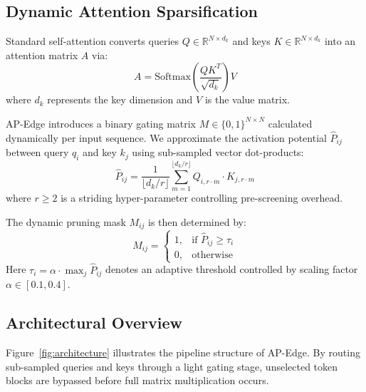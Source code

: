 \documentclass[runningheads]{llncs}
\begin{document}
\subsection{Dynamic Attention Sparsification}
Standard self-attention converts queries $Q \in \mathbb{R}^{N \times d_k}$ and keys $K \in \mathbb{R}^{N \times d_k}$ into an attention matrix $A$ via:
\begin{equation}
    A = \text{Softmax}\left( \frac{Q K^T}{\sqrt{d_k}} \right) V
    \label{eq:standard_attention}
\end{equation}
where $d_k$ represents the key dimension and $V$ is the value matrix.

AP-Edge introduces a binary gating matrix $M \in \{0, 1\}^{N \times N}$ calculated dynamically per input sequence. We approximate the activation potential $\hat{P}_{ij}$ between query $q_i$ and key $k_j$ using sub-sampled vector dot-products:
\begin{equation}
    \hat{P}_{ij} = \frac{1}{\lfloor d_k / r \rfloor} \sum_{m=1}^{\lfloor d_k / r \rfloor} Q_{i, r \cdot m} \cdot K_{j, r \cdot m}
    \label{eq:approx_potential}
\end{equation}
where $r \ge 2$ is a striding hyper-parameter controlling pre-screening overhead.

The dynamic pruning mask $M_{ij}$ is then determined by:
\begin{equation}
    M_{ij} = \begin{cases} 
    1, & \text{if } \hat{P}_{ij} \ge \tau_i \\
    0, & \text{otherwise}
    \end{cases}
    \label{eq:mask_definition}
\end{equation}
Here $\tau_i = \alpha \cdot \max_{j} \hat{P}_{ij}$ denotes an adaptive threshold controlled by scaling factor $\alpha \in [0.1, 0.4]$.

\subsection{Architectural Overview}
Figure~\ref{fig:architecture} illustrates the pipeline structure of AP-Edge. By routing sub-sampled queries and keys through a light gating stage, unselected token blocks are bypassed before full matrix multiplication occurs.
\end{document}
